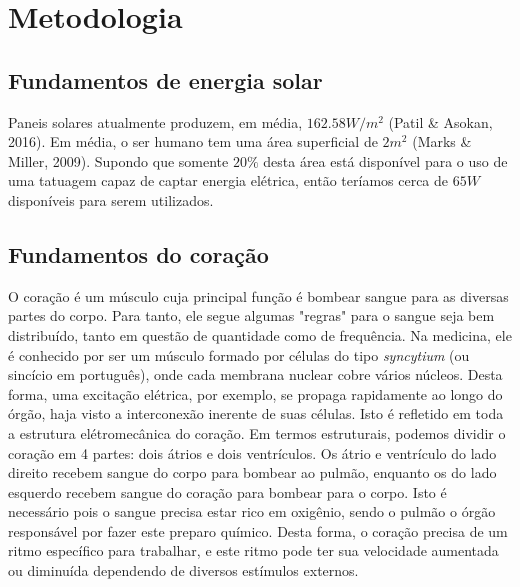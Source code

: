 \documentclass[12pt, a4paper, twoside]{article}
\begin{document}
\section{Metodologia}

\subsection{Fundamentos de energia solar}

Paneis solares atualmente produzem, em média, $ 162.58 W/m^2 $ (Patil \& Asokan, 2016). Em média, o ser humano tem uma área superficial de $2m^2$ (Marks \& Miller, 2009). Supondo que somente $20\%$ desta área está disponível para o uso de uma tatuagem capaz de captar energia elétrica, então teríamos cerca de $65W$ disponíveis para serem utilizados.

\subsection{Fundamentos do coração}

O coração é um músculo cuja principal função é bombear sangue para as diversas partes do corpo. Para tanto, ele segue algumas "regras" para o sangue seja bem distribuído, tanto em questão de quantidade como de frequência. Na medicina, ele é conhecido por ser um músculo formado por células do tipo \textit{syncytium} (ou sincício em português), onde cada membrana nuclear cobre vários núcleos. Desta forma, uma excitação elétrica, por exemplo, se propaga rapidamente ao longo do órgão, haja visto a interconexão inerente de suas células. Isto é refletido em toda a estrutura elétromecânica do coração. Em termos estruturais, podemos dividir o coração em 4 partes: dois átrios e dois ventrículos. Os átrio e ventrículo do lado direito recebem sangue do corpo para bombear ao pulmão, enquanto os do lado esquerdo recebem sangue do coração para bombear para o corpo. Isto é necessário pois o sangue precisa estar rico em oxigênio, sendo o pulmão o órgão responsável por fazer este preparo químico. Desta forma, o coração precisa de um ritmo específico para trabalhar, e este ritmo pode ter sua velocidade aumentada ou diminuída dependendo de diversos estímulos externos.
\end{document}
